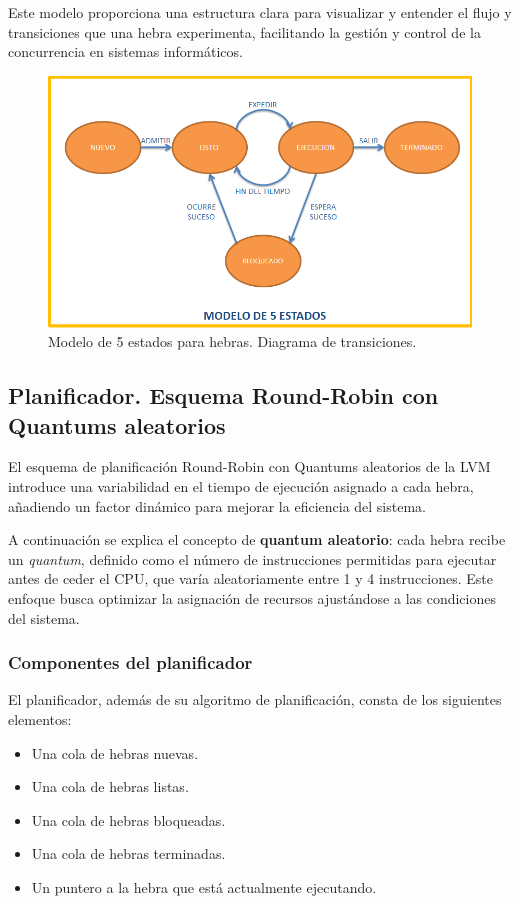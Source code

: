 Este modelo proporciona una estructura clara para visualizar y entender el flujo y transiciones que una hebra experimenta, facilitando la gestión y control de la concurrencia en sistemas informáticos.

\begin{figure}[h]
    \includegraphics[width=\linewidth]{images/implementacion/hebras/modelo5_estados.png}
    \caption{Modelo de 5 estados para hebras. Diagrama de transiciones.}
    \label{fig:modelo_estados_hebras}
\end{figure}

\newpage

\subsection{Planificador. Esquema Round-Robin con Quantums aleatorios}
El esquema de planificación Round-Robin con Quantums aleatorios de la LVM introduce una variabilidad en el tiempo de ejecución asignado a cada hebra, añadiendo un factor dinámico para mejorar la eficiencia del sistema.

A continuación se explica el concepto de \textbf{quantum aleatorio}: cada hebra recibe un \textit{quantum}, definido como el número de instrucciones permitidas para ejecutar antes de ceder el CPU, que varía aleatoriamente entre 1 y 4 instrucciones. Este enfoque busca optimizar la asignación de recursos ajustándose a las condiciones del sistema.

\subsubsection{Componentes del planificador}
\noindent
El planificador, además de su algoritmo de planificación, consta de los siguientes elementos:
\begin{itemize}
    \item Una cola de hebras nuevas.
    \item Una cola de hebras listas.
    \item Una cola de hebras bloqueadas.
    \item Una cola de hebras terminadas.
    \item Un puntero a la hebra que está actualmente ejecutando.
\end{itemize}

